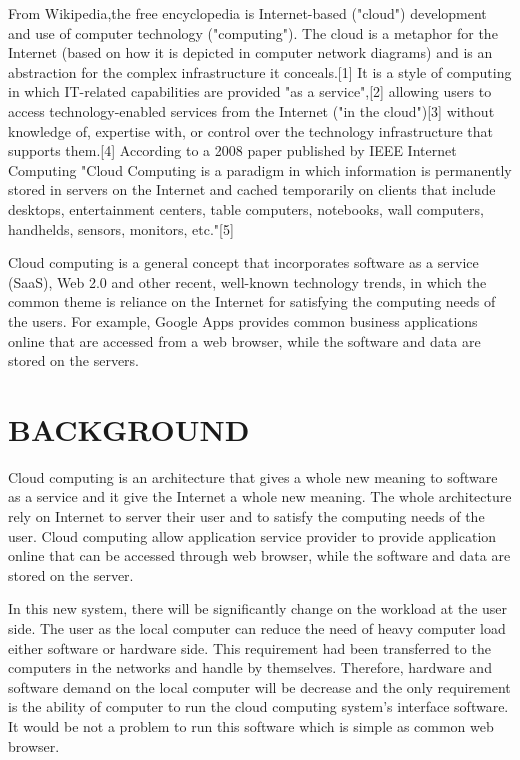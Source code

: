 \documentclass[conference, compsoc]{IEEEtran}
\begin{document}
From Wikipedia,the free encyclopedia is Internet-based ("cloud") development and use of computer technology ("computing"). The cloud is a metaphor for the Internet (based on how it is depicted in computer network diagrams) and is an abstraction for the complex infrastructure it conceals.[1] It is a style of computing in which IT-related capabilities are provided "as a service",[2] allowing users to access technology-enabled services from the Internet ("in the cloud")[3] without knowledge of, expertise with, or control over the technology infrastructure that supports them.[4] According to a 2008 paper published by IEEE Internet Computing "Cloud Computing is a paradigm in which information is permanently stored in servers on the Internet and cached temporarily on clients that include desktops, entertainment centers, table computers, notebooks, wall computers, handhelds, sensors, monitors, etc."[5]

Cloud computing is a general concept that incorporates software as a service (SaaS), Web 2.0 and other recent, well-known technology trends, in which the common theme is reliance on the Internet for satisfying the computing needs of the users. For example, Google Apps provides common business applications online that are accessed from a web browser, while the software and data are stored on the servers.
\section{BACKGROUND}

Cloud computing is an architecture that gives a whole new meaning to software as a service and it give the Internet a whole new meaning. The whole architecture rely on Internet to server their user and to satisfy the computing needs of the user. Cloud computing allow application service provider to provide application online that can be accessed through web browser, while the software and data are stored on the server.

In this new system, there will be significantly change on the workload at the user side. The user as the local computer can reduce the need of heavy computer load either software or hardware side. This requirement had been transferred to the computers in the networks and handle by themselves. Therefore, hardware and software demand on the local computer will be decrease and the only requirement is the ability of computer to run the cloud computing system's interface software.  It would be not a problem to run this software which is simple as common web browser. 
\end{document}
